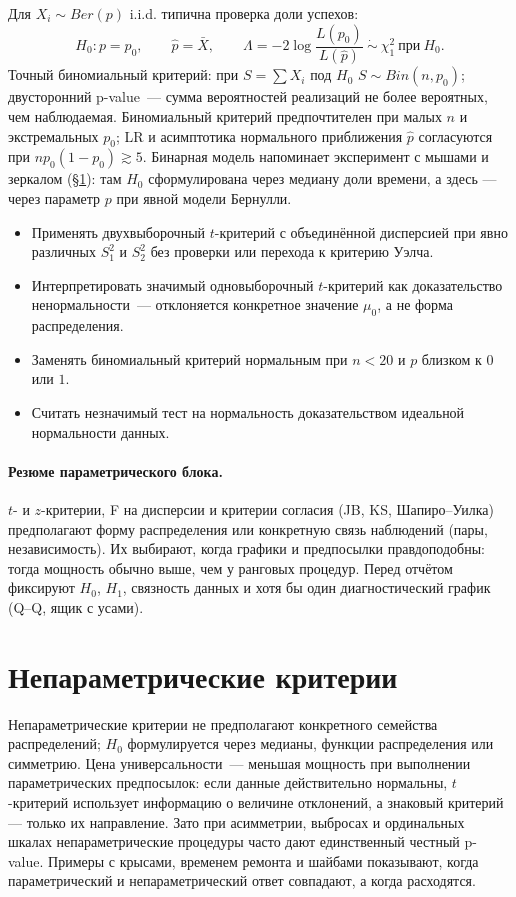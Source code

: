 Для $X_i\sim Ber(p)$ i.i.d. типична проверка доли успехов: \[ H_0\colon p=p_0,\qquad \hat p=\bar X,\qquad \Lambda=-2\log\frac{L(p_0)}{L(\hat p)}\ \dot\sim\ \chi^2_1\ \text{при}\ H_0.
\] Точный биномиальный критерий: при $S=\sum X_i$ под $H_0$ $S\sim Bin(n,p_0)$; двусторонний p-value~--- сумма вероятностей реализаций не более вероятных, чем наблюдаемая.
Биномиальный критерий предпочтителен при малых $n$ и экстремальных $p_0$; LR и асимптотика нормального приближения $\hat p$ согласуются при $np_0(1-p_0)\gtrsim 5$.
Бинарная модель напоминает эксперимент с мышами и зеркалом (\S\ref{sec:nonparametric}): там $H_0$ сформулирована через медиану доли времени, а здесь --- через параметр $p$ при явной модели Бернулли.

\begin{itemize}
 \item Применять двухвыборочный $t$-критерий с объединённой дисперсией
 при явно различных $S_1^2$ и $S_2^2$ без проверки или перехода к критерию Уэлча.
 \item Интерпретировать значимый одновыборочный $t$-критерий как
 доказательство ненормальности~--- отклоняется конкретное значение $\mu_0$, а не форма распределения.
 \item Заменять биномиальный критерий нормальным при $n<20$
 и $p$ близком к $0$ или $1$.
 \item Считать незначимый тест на нормальность доказательством
 идеальной нормальности данных.
\end{itemize}

\paragraph{Резюме параметрического блока.}
$t$- и $z$-критерии, F на дисперсии и критерии согласия (JB, KS, Шапиро--Уилка) предполагают форму распределения или конкретную связь наблюдений (пары, независимость).
Их выбирают, когда графики и предпосылки правдоподобны: тогда мощность обычно выше, чем у ранговых процедур.
Перед отчётом фиксируют $H_0$, $H_1$, связность данных и хотя бы один диагностический график (Q--Q, ящик с усами).

\section{Непараметрические критерии}
\label{sec:nonparametric}

Непараметрические критерии не предполагают конкретного семейства распределений; $H_0$ формулируется через медианы, функции распределения или симметрию.
Цена универсальности~--- меньшая мощность при выполнении параметрических предпосылок: если данные действительно нормальны, $t$-критерий использует информацию о величине отклонений, а знаковый критерий --- только их направление.
Зато при асимметрии, выбросах и ординальных шкалах непараметрические процедуры часто дают единственный честный p-value.
Примеры с крысами, временем ремонта и шайбами показывают, когда параметрический и непараметрический ответ совпадают, а когда расходятся.

